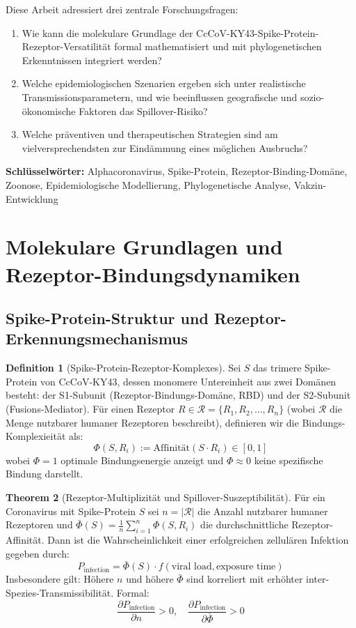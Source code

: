 \documentclass[11pt,a4paper]{article}
\theoremstyle{definition}
\newtheorem{theorem}{Theorem}[section]
\newtheorem{definition}[theorem]{Definition}
\begin{document}
Diese Arbeit adressiert drei zentrale Forschungsfragen:
\begin{enumerate}
\item Wie kann die molekulare Grundlage der CcCoV-KY43-Spike-Protein-Rezeptor-Versatilität formal mathematisiert und mit phylogenetischen Erkenntnissen integriert werden?
\item Welche epidemiologischen Szenarien ergeben sich unter realistische Transmissionsparametern, und wie beeinflussen geografische und sozio-ökonomische Faktoren das Spillover-Risiko?
\item Welche präventiven und therapeutischen Strategien sind am vielversprechendsten zur Eindämmung eines möglichen Ausbruchs?
\end{enumerate}

\textbf{Schlüsselwörter:} Alphacoronavirus, Spike-Protein, Rezeptor-Binding-Domäne, Zoonose, Epidemiologische Modellierung, Phylogenetische Analyse, Vakzin-Entwicklung

\section{Molekulare Grundlagen und Rezeptor-Bindungsdynamiken}

\subsection{Spike-Protein-Struktur und Rezeptor-Erkennungsmechanismus}

\begin{definition}[Spike-Protein-Rezeptor-Komplexes]
Sei $S$ das trimere Spike-Protein von CcCoV-KY43, dessen monomere Untereinheit aus zwei Domänen besteht: der S1-Subunit (Rezeptor-Bindungs-Domäne, RBD) und der S2-Subunit (Fusions-Mediator). Für einen Rezeptor $R \in \mathcal{R} = \{R_1, R_2, \ldots, R_n\}$ (wobei $\mathcal{R}$ die Menge nutzbarer humaner Rezeptoren beschreibt), definieren wir die Bindungs-Komplexieität als:
\[
\Phi(S, R_i) := \text{Affinität}(S \cdot R_i) \in [0, 1]
\]
wobei $\Phi = 1$ optimale Bindungsenergie anzeigt und $\Phi \approx 0$ keine spezifische Bindung darstellt.
\end{definition}

\begin{theorem}[Rezeptor-Multiplizität und Spillover-Suszeptibilität]
\label{thm:receptor_multiplicity}
Für ein Coronavirus mit Spike-Protein $S$ sei $n = |\mathcal{R}|$ die Anzahl nutzbarer humaner Rezeptoren und $\bar{\Phi}(S) = \frac{1}{n} \sum_{i=1}^{n} \Phi(S, R_i)$ die durchschnittliche Rezeptor-Affinität. Dann ist die Wahrscheinlichkeit einer erfolgreichen zellulären Infektion gegeben durch:
\[
P_{\text{infection}} = \bar{\Phi}(S) \cdot f(\text{viral load}, \text{exposure time})
\]
Insbesondere gilt: Höhere $n$ und höhere $\bar{\Phi}$ sind korreliert mit erhöhter inter-Spezies-Transmissibilität. Formal: 
\[
\frac{\partial P_{\text{infection}}}{\partial n} > 0, \quad \frac{\partial P_{\text{infection}}}{\partial \bar{\Phi}} > 0
\]
\end{theorem}
\end{document}
